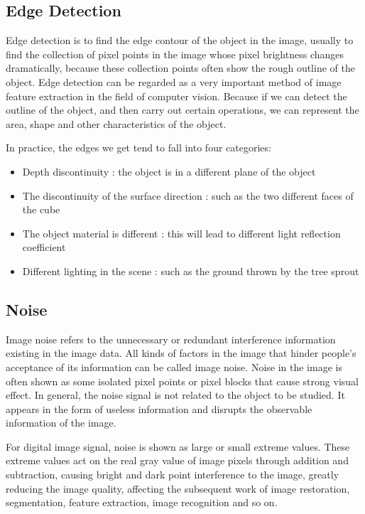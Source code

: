 \documentclass[review]{cvpr}
\begin{document}
\subsection{Edge Detection}

Edge detection is to find the edge contour of the object in the image, usually to find the collection of pixel points in the image whose pixel brightness changes dramatically, because these collection points often show the rough outline of the object. Edge detection can be regarded as a very important method of image feature extraction in the field of computer vision. Because if we can detect the outline of the object, and then carry out certain operations, we can represent the area, shape and other characteristics of the object.

In practice, the edges we get tend to fall into four categories:

\begin{itemize}
  \item Depth discontinuity : the object is in a different plane of the object
  \item The discontinuity of the surface direction : such as the two different faces of the cube
  \item The object material is different : this will lead to different light reflection coefficient
  \item Different lighting in the scene : such as the ground thrown by the tree sprout
\end{itemize}

\subsection{Noise}
Image noise refers to the unnecessary or redundant interference information existing in the image data. All kinds of factors in the image that hinder people's acceptance of its information can be called image noise. Noise in the image is often shown as some isolated pixel points or pixel blocks that cause strong visual effect. In general, the noise signal is not related to the object to be studied. It appears in the form of useless information and disrupts the observable information of the image. 

For digital image signal, noise is shown as large or small extreme values. These extreme values act on the real gray value of image pixels through addition and subtraction, causing bright and dark point interference to the image, greatly reducing the image quality, affecting the subsequent work of image restoration, segmentation, feature extraction, image recognition and so on.
\end{document}
